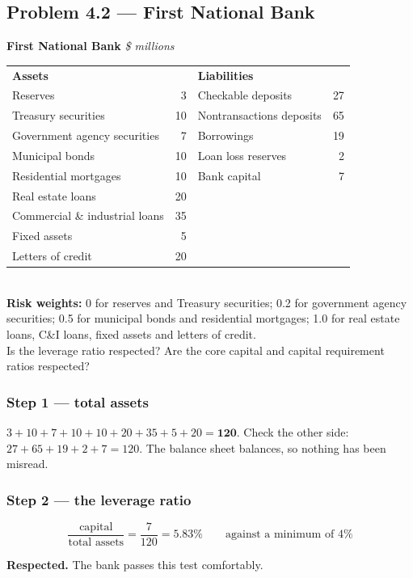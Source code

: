 \documentclass[11pt,a4paper]{article}
\newcommand{\keylab}[1]{\textcolor{ifclay}{\textbf{#1}}}
\begin{document}
\subsection*{Problem 4.2 --- First National Bank}

\begin{probbox}
\textbf{First National Bank} \hfill \textit{\$ millions}\\[4pt]
\begin{tabularx}{\linewidth}{@{}Xr@{\hskip 18pt}Xr@{}}
\textbf{Assets} & & \textbf{Liabilities} & \\
Reserves & 3 & Checkable deposits & 27\\
Treasury securities & 10 & Nontransactions deposits & 65\\
Government agency securities & 7 & Borrowings & 19\\
Municipal bonds & 10 & Loan loss reserves & 2\\
Residential mortgages & 10 & Bank capital & 7\\
Real estate loans & 20 & & \\
Commercial \& industrial loans & 35 & & \\
Fixed assets & 5 & & \\
Letters of credit & 20 & & \\
\end{tabularx}\\[6pt]
\textbf{Risk weights:} 0 for reserves and Treasury securities; 0.2 for
government agency securities; 0.5 for municipal bonds and residential mortgages;
1.0 for real estate loans, C\&I loans, fixed assets and letters of credit.\\[4pt]
Is the leverage ratio respected? Are the core capital and capital requirement
ratios respected?
\end{probbox}

\subsubsection*{Step 1 --- total assets}
$3 + 10 + 7 + 10 + 10 + 20 + 35 + 5 + 20 = \mathbf{120}$. Check the other side:
$27 + 65 + 19 + 2 + 7 = 120$. The balance sheet balances, so nothing has been
misread.

\subsubsection*{Step 2 --- the leverage ratio}
\[ \frac{\text{capital}}{\text{total assets}} = \frac{7}{120} = \mathbf{5.83\%}
   \qquad \text{against a minimum of } 4\% \]
\begin{keybox}
\keylab{Respected.} The bank passes this test comfortably.
\end{keybox}
\end{document}
